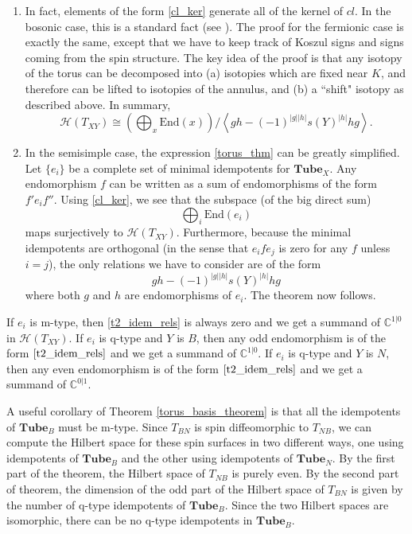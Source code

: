 \documentclass[12pt,a4paper]{article}
\newcommand{\cc}{\mathbb{C}}
\newcommand{\mch}{\mathcal{H}}
\newcommand\be            {\begin{equation}}
\newcommand\ee            {\end{equation}}
\newcommand{\End}{\text{End}}
\newcommand{\tube}{\textbf{Tube}}
\begin{document}
\begin{enumerate}
\item In fact, elements of the form \eqref{cl_ker} generate all of the kernel of $cl$.
In the bosonic case, this is a standard fact (see \cite{walker2006}).
The proof for the fermionic case is exactly the same, except that we have to keep track of
Koszul signs and signs coming from the spin structure.
The key idea of the proof is that any isotopy of the torus can be decomposed into (a) isotopies which
are fixed near $K$, and therefore can be lifted to isotopies of the annulus, and (b) a ``shift" isotopy
as described above.
In summary,
\be \label{torus_thm}
	\mch(T_{XY}) \cong \left( \bigoplus_x \End(x) \right) / \left\langle gh - (-1)^{|g| |h|} s(Y)^{|h|} hg \right\rangle .
\ee

\item In the semisimple case, the expression \eqref{torus_thm} can be greatly simplified.
Let $\{e_i\}$ be a complete set of minimal idempotents for $\tube_X$.
Any endomorphism $f$ can be written as a sum of endomorphisms of the form $f' e_i f''$.
Using \eqref{cl_ker}, we see that the subspace (of the big direct sum)
\be
	\bigoplus_i \End(e_i)
\ee
maps surjectively to $\mch(T_{XY})$.
Furthermore, because the minimal idempotents are orthogonal (in the sense that $e_i f e_j$ is zero for any $f$ unless $i=j$),
the only relations we have to consider are of the form
\be \label{t2_idem_rels}
	gh - (-1)^{|g| |h|} s(Y)^{|h|} hg
\ee
where both $g$ and $h$ are endomorphisms of $e_i$.
The theorem now follows.
\end{enumerate}

If $e_i$ is m-type, then \eqref{t2_idem_rels} is always zero and we get a summand of $\cc^{1|0}$ in $\mch(T_{XY})$.
If $e_i$ is q-type and $Y$ is $B$, then any odd endomorphism is of the form $\eqref{t2_idem_rels}$
and we get a summand of $\cc^{1|0}$.
If $e_i$ is q-type and $Y$ is $N$, then any even endomorphism is of the form $\eqref{t2_idem_rels}$
and we get a summand of $\cc^{0|1}$.

A useful corollary of Theorem \ref{torus_basis_theorem} is that all the idempotents of 
$\tube_B$ must be m-type.
Since $T_{BN}$ is spin diffeomorphic to $T_{NB}$, we can compute the Hilbert space for 
these spin surfaces in two different ways, one using
idempotents of $\tube_B$ and the other using idempotents of $\tube_N$.
By the first part of the theorem, the Hilbert space of $T_{NB}$ is purely even.
By the second part of theorem, the dimension of the odd part of the Hilbert space of $T_{BN}$
is given by the number of q-type idempotents of $\tube_B$.
Since the two Hilbert spaces are isomorphic, there can be no q-type idempotents in $\tube_B$.
\end{document}
